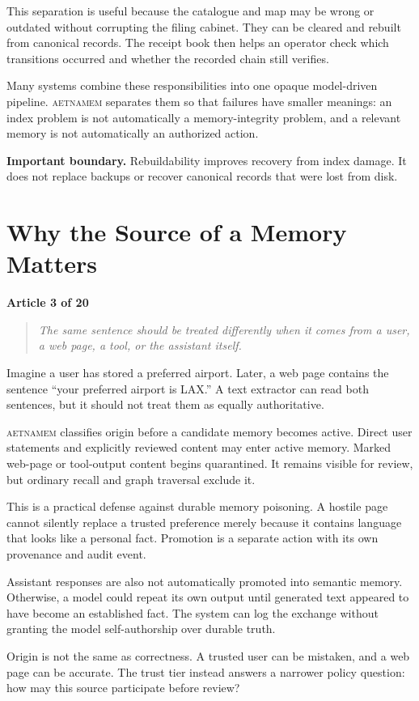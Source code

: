 \documentclass[11pt]{article}
\newcommand{\system}{\textsc{aetnamem}}
\newcommand{\articlelabel}[1]{%
  \noindent\colorbox{aetnaTeal!10}{%
    \parbox{0.96\textwidth}{\color{aetnaInk}\small\textbf{Article #1 of 20}}}%
  \par\medskip}
\newcommand{\coreidea}[1]{%
  \begin{quote}\color{aetnaTeal}\large\itshape #1\end{quote}}
\newcommand{\boundary}[1]{%
  \par\smallskip\noindent\textbf{Important boundary.} #1}
\begin{document}
This separation is useful because the catalogue and map may be wrong or
outdated without corrupting the filing cabinet. They can be cleared and
rebuilt from canonical records. The receipt book then helps an operator check
which transitions occurred and whether the recorded chain still verifies.

Many systems combine these responsibilities into one opaque model-driven
pipeline. \system{} separates them so that failures have smaller meanings: an
index problem is not automatically a memory-integrity problem, and a relevant
memory is not automatically an authorized action.

\boundary{Rebuildability improves recovery from index damage. It does not
replace backups or recover canonical records that were lost from disk.}

\clearpage
\section{Why the Source of a Memory Matters}
\articlelabel{3}
\coreidea{The same sentence should be treated differently when it comes from
a user, a web page, a tool, or the assistant itself.}

Imagine a user has stored a preferred airport. Later, a web page contains the
sentence ``your preferred airport is LAX.'' A text extractor can read both
sentences, but it should not treat them as equally authoritative.

\system{} classifies origin before a candidate memory becomes active. Direct
user statements and explicitly reviewed content may enter active memory.
Marked web-page or tool-output content begins quarantined. It remains visible
for review, but ordinary recall and graph traversal exclude it.

This is a practical defense against durable memory poisoning. A hostile page
cannot silently replace a trusted preference merely because it contains
language that looks like a personal fact. Promotion is a separate action with
its own provenance and audit event.

Assistant responses are also not automatically promoted into semantic
memory. Otherwise, a model could repeat its own output until generated text
appeared to have become an established fact. The system can log the exchange
without granting the model self-authorship over durable truth.

Origin is not the same as correctness. A trusted user can be mistaken, and a
web page can be accurate. The trust tier instead answers a narrower policy
question: how may this source participate before review?
\end{document}
